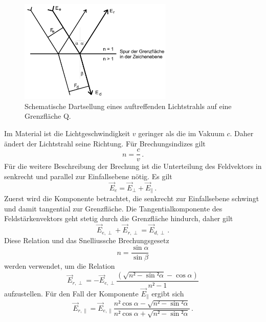 \begin{figure}
    \centering
    \includegraphics[width=0.65\textwidth]{content/Bilder/allgemeines_Bild.jpeg}
    \caption{Schematische Dartsellung eines auftreffenden Lichtstrahls auf eine Grenzfläche Q\cite{anleitungV407}.}
    \label{fig:allgemein}
\end{figure}
Im Material ist die Lichtgeschwindigkeit $v$ geringer als die im Vakuum $c$. Daher ändert der Lichtstrahl seine Richtung. Für Brechungsindizes 
gilt 
\begin{equation}
    n = \frac{c}{v}\, .
    \label{eqn:Brechungsindex}
\end{equation}
Für die weitere Beschreibung der Brechung ist die Unterteilung des Feldvektors in senkrecht und parallel zur Einfallsebene nötig. Es gilt 
\begin{equation}
    \vec{E}_e = \vec{E}_{\perp} + \vec{E}_{\parallel} \, .
    \label{eqn:Aufteilung}
\end{equation}
Zuerst wird die Komponente betrachtet, die senkrecht zur Einfallsebene schwingt und damit tangential zur Grenzfläche. 
Die Tangentialkomponente des Feldstärkenvektors geht stetig durch die Grenzfläche hindurch, daher gilt 
\begin{equation}
    \vec{E}_{e,\perp} + \vec{E}_{r,\perp} = \vec{E}_{d,\perp} \, .
\end{equation}
Diese Relation und das Snelliussche Brechungsgesetz 
\begin{equation}
    n = \frac{\sin{\alpha}}{\sin{\beta}}
    \label{eqn:snivellus}
\end{equation}
werden verwendet, um die Relation 
\begin{equation}
    \vec{E}_{r,\perp} = - \vec{E}_{e,\perp} \frac{\left(\sqrt{n² - \sin²{\alpha}}- \cos{\alpha}\right)}{n² - 1}
    \label{eqn:E_r_senkrecht}
\end{equation}
aufzustellen.
Für den Fall der Komponente $\vec{E}_{\parallel}$ ergibt sich 
\begin{equation}
    \vec{E}_{r,\parallel} = \vec{E}_{e,\parallel} \frac{n² \cos{\alpha} - \sqrt{n² - \sin²{\alpha}}}{n² \cos{\alpha} + \sqrt{n² - \sin²{\alpha}}} \, .
    \label{eqn:E_r_parallel}
\end{equation}
